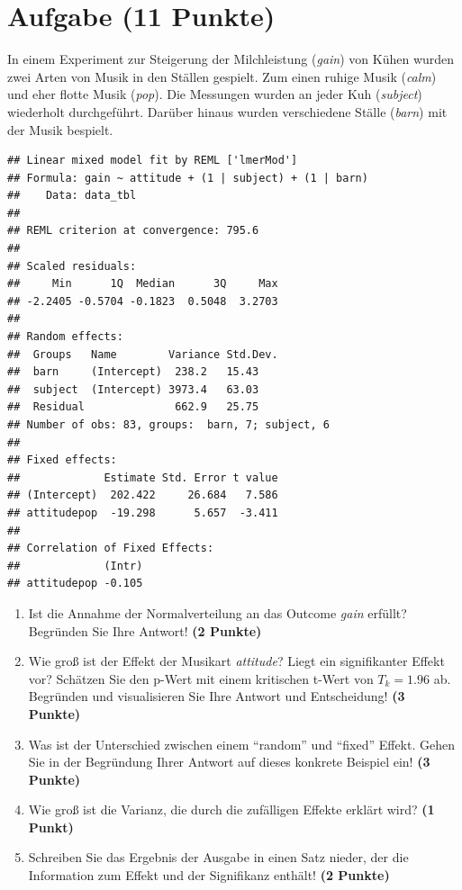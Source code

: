 \documentclass[a4paper, 10pt]{scrartcl}\usepackage[]{graphicx}\usepackage[]{xcolor}
\makeatletter
\newenvironment{kframe}{%
 \def\at@end@of@kframe{}%
 \ifinner\ifhmode%
  \def\at@end@of@kframe{\end{minipage}}%
  \begin{minipage}{\columnwidth}%
 \fi\fi%
 \def\FrameCommand##1{\hskip\@totalleftmargin \hskip-\fboxsep
 \colorbox{shadecolor}{##1}\hskip-\fboxsep
     \hskip-\linewidth \hskip-\@totalleftmargin \hskip\columnwidth}%
 \MakeFramed {\advance\hsize-\width
   \@totalleftmargin\z@ \linewidth\hsize
   \@setminipage}}%
 {\par\unskip\endMakeFramed%
 \at@end@of@kframe}
\newenvironment{knitrout}{}{} %
\makeatother
\begin{document}
\clearpage

\section{Aufgabe \hfill (11 Punkte)}

In einem Experiment zur Steigerung der Milchleistung (\textit{gain}) von
K{\"u}hen wurden zwei Arten von Musik in den St{\"a}llen gespielt. Zum einen ruhige
Musik (\textit{calm}) und eher flotte Musik (\textit{pop}). Die Messungen
wurden an jeder Kuh (\textit{subject}) wiederholt durchgef{\"u}hrt. Dar{\"u}ber
hinaus wurden verschiedene St{\"a}lle (\textit{barn}) mit der Musik bespielt.

\begin{knitrout}
\color{fgcolor}\begin{kframe}
\begin{verbatim}
## Linear mixed model fit by REML ['lmerMod']
## Formula: gain ~ attitude + (1 | subject) + (1 | barn)
##    Data: data_tbl
## 
## REML criterion at convergence: 795.6
## 
## Scaled residuals: 
##     Min      1Q  Median      3Q     Max 
## -2.2405 -0.5704 -0.1823  0.5048  3.2703 
## 
## Random effects:
##  Groups   Name        Variance Std.Dev.
##  barn     (Intercept)  238.2   15.43   
##  subject  (Intercept) 3973.4   63.03   
##  Residual              662.9   25.75   
## Number of obs: 83, groups:  barn, 7; subject, 6
## 
## Fixed effects:
##             Estimate Std. Error t value
## (Intercept)  202.422     26.684   7.586
## attitudepop  -19.298      5.657  -3.411
## 
## Correlation of Fixed Effects:
##             (Intr)
## attitudepop -0.105
\end{verbatim}
\end{kframe}
\end{knitrout}


\begin{enumerate}
\item Ist die Annahme der Normalverteilung an das Outcome \textit{gain} erf{\"u}llt?
  Begr{\"u}nden Sie Ihre Antwort! \textbf{(2 Punkte)}
\item Wie gro{\ss} ist der Effekt der Musikart \textit{attitude}? Liegt ein signifikanter
  Effekt vor? Sch{\"a}tzen Sie den p-Wert mit einem kritischen t-Wert von $T_k
  = 1.96$ ab. Begr{\"u}nden und visualisieren Sie Ihre Antwort und
  Entscheidung! \textbf{(3 Punkte)}
\item Was ist der Unterschied zwischen einem "`random"' und "`fixed"'
  Effekt. Gehen Sie in der Begr{\"u}ndung Ihrer Antwort auf dieses konkrete
  Beispiel ein! \textbf{(3 Punkte)}
\item Wie gro{\ss} ist die Varianz, die durch die zuf{\"a}lligen Effekte erkl{\"a}rt wird? \textbf{(1 Punkt)}
\item Schreiben Sie das Ergebnis der \Rlogo Ausgabe in einen Satz nieder, der die
  Information zum Effekt und der Signifikanz enth{\"a}lt! \textbf{(2 Punkte)}
\end{enumerate}
 
\end{document}
